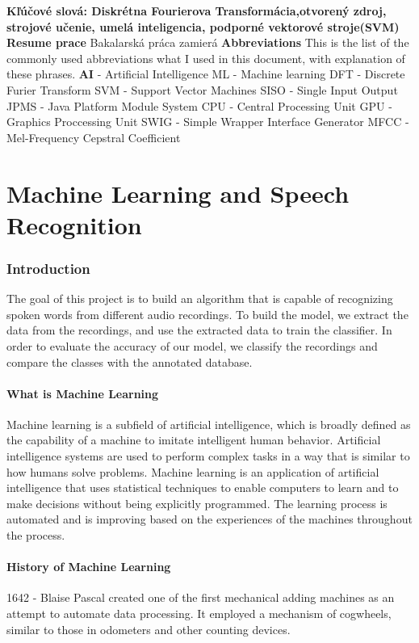 \documentclass[english,12pt,oneside,a4paper]{article}
\begin{document}
	\textbf{Kľúčové slová: Diskrétna Fourierova Transformácia,otvorený zdroj, strojové učenie, umelá inteligencia, podporné vektorové stroje(SVM)}
	\newpage
	\textbf{Resume prace}
	\newline
	Bakalarská práca zamierá 
	\newpage
	\newpage
	\tableofcontents
	\newpage
	\textbf{Abbreviations}
	\newline
	\newline
	This is the list of the commonly used abbreviations what I used in this document, with explanation of these phrases.
	\newline
	\textbf{AI} - Artificial Intelligence
	ML - Machine learning
	DFT - Discrete Furier Transform
	SVM - Support Vector Machines
	SISO - Single Input Output
	JPMS - Java Platform Module System
	CPU - Central Processing Unit 
	GPU - Graphics Proccessing Unit
	SWIG - Simple Wrapper Interface Generator
	MFCC - Mel-Frequency Cepstral Coefficient
	\newpage
	\part{Machine Learning and Speech Recognition}
		\section{Introduction}
		The goal of this project is to build an algorithm that is capable of recognizing spoken words from different audio recordings. To build the model, we extract the data from the recordings, and use the extracted data to train the classifier. In order to evaluate the  accuracy of our model, we classify the recordings and compare the classes with the annotated database.
		\subsection{What is Machine Learning}
		Machine learning is a subfield of artificial intelligence, which is broadly defined as the capability of a machine to imitate intelligent human behavior. Artificial intelligence systems are used to perform complex tasks in a way that is similar to how humans solve problems.
		Machine learning is an application of artificial intelligence that uses statistical techniques to enable computers to learn and to make decisions without being explicitly programmed. The learning process is automated and is improving based on the experiences of the machines throughout the process.
		\subsection{History of Machine Learning}
		1642 - Blaise Pascal created one of the first mechanical adding machines as an attempt to automate data processing. It employed a mechanism of cogwheels, similar to those in odometers and other counting devices.
		
\end{document}
